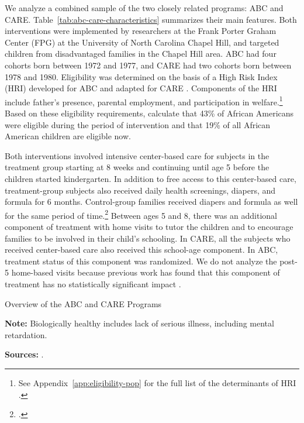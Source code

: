 We analyze a combined sample of the two closely related programs: ABC and CARE. Table~\ref{tab:abc-care-characteristics} summarizes their main features. Both interventions were implemented by researchers at the Frank Porter Graham Center (FPG) at the University of North Carolina Chapel Hill, and targeted children from disadvantaged families in the Chapel Hill area. ABC had four cohorts born between 1972 and 1977, and CARE had two cohorts born between 1978 and 1980. Eligibility was determined on the basis of a High Risk Index (HRI) developed for ABC and adapted for CARE \citep{Ramey_Smith_1977_AJMD,Wasik_Ramey_etal_1990_CD}. Components of the HRI include father's presence, parental employment, and participation in welfare.\footnote{See Appendix~\ref{app:eligibility-pop} for the full list of the determinants of HRI \citep{Ramey_Smith_1977_AJMD, Wasik_Ramey_etal_1990_CD, Ramey_Campbell_1991_childreninpoverty}.} Based on these eligibility requirements, \citet{Garcia_Heckman_Leaf_etal_2017_Comp_CBA_Unpublished} calculate that 43\% of African Americans were eligible during the period of intervention and that 19\% of all African American children are eligible now.

Both interventions involved intensive center-based care for subjects in the treatment group starting at 8 weeks and continuing until age 5 before the children started kindergarten. In addition to free access to this center-based care, treatment-group subjects also received daily health screenings, diapers, and formula for 6 months. Control-group families received diapers and formula as well for the same period of time.\footnote{\citet{Wasik_Ramey_etal_1990_CD,Ramey_Campbell_1991_childreninpoverty}.} Between ages 5 and 8, there was an additional component of treatment with home visits to tutor the children and to encourage families to be involved in their child's schooling. In CARE, all the subjects who received center-based care also received this school-age component. In ABC, treatment status of this component was randomized. We do not analyze the post-5 home-based visits because previous work has found that this component of treatment has no statistically significant impact \citep{Campbell_Ramey_etal_2002_ADS,Campbell_Conti_etal_2014_EarlyChildhoodInvestments}.

\begin{table}[!htbp]
\centering
\caption{Overview of the ABC and CARE Programs}
\label{tab:abc-care-characteristics}
\begin{threeparttable}
	
\begin{tablenotes}
\footnotesize
\item \textbf{Note:} Biologically healthy includes lack of serious illness, including mental retardation. \\
\item \textbf{Sources:} \citet{Ramey_Collier_etal_1976_CarolinaAbecedarianProject,Ramey_Smith_1977_AJMD,Ramey_etal_1985_Project-CARE_TiECSE,Wasik_Ramey_etal_1990_CD,Ramey_Campbell_1991_childreninpoverty}.
\end{tablenotes}
\end{threeparttable}
\end{table}

